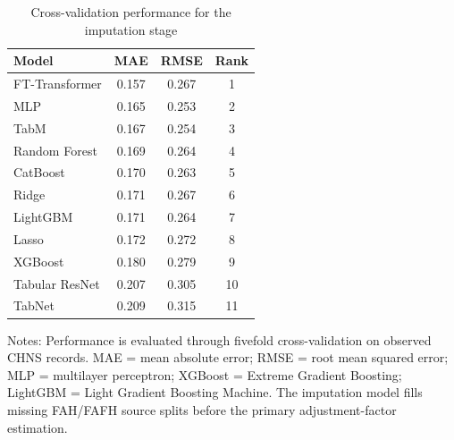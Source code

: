 \documentclass[preprint,12pt,authoryear]{elsarticle}
\begin{document}
\begin{table}[htbp]
\centering
\begin{threeparttable}
\caption{Cross-validation performance for the imputation stage}
\label{tab:imputation}
\small
\setlength{\tabcolsep}{0pt}
\begin{tabular*}{\textwidth}{@{\extracolsep{\fill}} l ccc @{}}
\toprule
Model & MAE & RMSE & Rank \\
\midrule
FT-Transformer & 0.157 & 0.267 & 1 \\
MLP            & 0.165 & 0.253 & 2 \\
TabM           & 0.167 & 0.254 & 3 \\
Random Forest  & 0.169 & 0.264 & 4 \\
CatBoost       & 0.170 & 0.263 & 5 \\
Ridge          & 0.171 & 0.267 & 6 \\
LightGBM       & 0.171 & 0.264 & 7 \\
Lasso          & 0.172 & 0.272 & 8 \\
XGBoost        & 0.180 & 0.279 & 9 \\
Tabular ResNet & 0.207 & 0.305 & 10 \\
TabNet         & 0.209 & 0.315 & 11 \\
\bottomrule
\end{tabular*}
\begin{tablenotes}[flushleft]
\scriptsize
\item Notes: Performance is evaluated through fivefold cross-validation on observed CHNS records. MAE = mean absolute error; RMSE = root mean squared error; MLP = multilayer perceptron; XGBoost = Extreme Gradient Boosting; LightGBM = Light Gradient Boosting Machine. The imputation model fills missing FAH/FAFH source splits before the primary adjustment-factor estimation.
\end{tablenotes}
\end{threeparttable}
\end{table}
\end{document}
